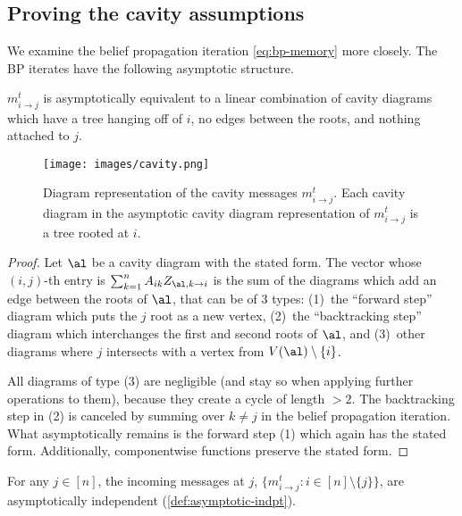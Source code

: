 \documentclass[12pt]{article}
\begin{document}
\subsection{Proving the cavity assumptions}
\label{sec:cavity-formal}

We examine the belief propagation iteration
\cref{eq:bp-memory} more closely.
The BP iterates have the following asymptotic structure.


\begin{lemma}\label{lem:mij-structure}
    $m_{i \to j}^t$ is asymptotically
    equivalent to a linear combination of cavity diagrams which 
    have a tree hanging off of $i$, no edges between the roots, and nothing attached to $j$.
    \begin{figure}[ht]
    \centering
    \texttt{[image: images/cavity.png]} 
    \caption{
    Diagram representation of the cavity messages $m^t_{i\to j}$. Each cavity diagram in the asymptotic cavity diagram representation of $m^t_{i\to j}$ is a tree rooted at $i$.}
    \label{fig:cavity}
\end{figure}
\end{lemma}

\begin{proof}
Let $\al$ be a cavity diagram with the stated form. The vector whose $(i,j)$-th entry is $\sum_{\substack{k = 1}}^n A_{ik}Z_{\al,k \to i}$ is the sum of the diagrams which add an edge between the roots of $\al$, that can be of 3 types: (1)~the ``forward step'' diagram which puts the $j$ root as a new vertex, (2)~the ``backtracking step'' diagram which interchanges the first and second roots of $\al$, and (3)~other diagrams where $j$ intersects with a vertex from $V(\al) \setminus \{i\}$.

All diagrams of type (3) are negligible (and stay so when applying further
operations to them), because they create a cycle of length $>2$.
The backtracking step in (2) is canceled
by summing over $k \neq j$ in the belief propagation iteration. What asymptotically remains is the forward step (1) which again has the stated form. Additionally, componentwise functions preserve the stated form.
\end{proof}



\begin{theorem}
    \label{thm:cavity-formal}
    For any $j\in [n]$, the incoming messages
    at $j$, $\{m^t_{i\to j}:i\in [n]\setminus\{j\}\}$, are
    asymptotically independent (\cref{def:asymptotic-indpt}).
\end{theorem}
\end{document}
